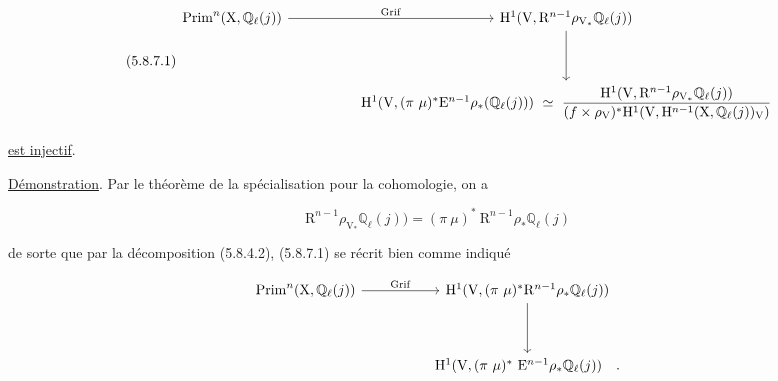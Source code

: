 \begin{equation}\tag{5.8.7.1}
\begin{tikzcd}[column sep=huge, row sep=huge]
\mathrm{Prim}^n(\mathrm{X},\mathbb{Q}_\ell(j)) \arrow[r, "\mathrm{Grif}"] & \mathrm{H}^1(\mathrm{V},\mathrm{R}^{n-1}\rho_{\mathrm{V}_*}\mathbb{Q}_\ell(j)) \arrow[d] \\
{} & \mathrm{H}^1(\mathrm{V},(\pi\ \mu)^*\mathrm{E}^{n-1}\rho_*(\mathbb{Q}_\ell(j))) \ \simeq \ \dfrac{\mathrm{H}^1(\mathrm{V},\mathrm{R}^{n-1}\rho_{\mathrm{V}_*}\mathbb{Q}_\ell(j))}{(f\times\rho_{\mathrm{V}})^* \mathrm{H}^1(\mathrm{V},\mathrm{H}^{n-1}(\mathrm{X},\mathbb{Q}_\ell(j))_{\mathrm{V}})}
\end{tikzcd}
\end{equation}

\underline{est injectif}.

\underline{Démonstration}. Par le théorème de la spécialisation pour la cohomologie, on a

\begin{equation*}
\mathrm{R}^{n-1}\rho_{\mathrm{V}_*}\mathbb{Q}_\ell(j)) = (\pi\ \mu)^* \ \mathrm{R}^{n-1}\rho_*\mathbb{Q}_\ell(j)
\end{equation*}



%
%
de sorte que par la décomposition (5.8.4.2), (5.8.7.1) se récrit bien comme indiqué

\begin{equation*}
\begin{tikzcd}[column sep=huge, row sep=huge]
\mathrm{Prim}^n(\mathrm{X},\mathbb{Q}_\ell(j)) \arrow[r, "\mathrm{Grif}"] & \mathrm{H}^1(\mathrm{V},(\pi\ \mu)^*\mathrm{R}^{n-1}\rho_*\mathbb{Q}_\ell(j)) \arrow[d] \\
{} & \mathrm{H}^1(\mathrm{V},(\pi\ \mu)^* \ \mathrm{E}^{n-1}\rho_*\mathbb{Q}_\ell(j)) \quad .
\end{tikzcd}
\end{equation*}

